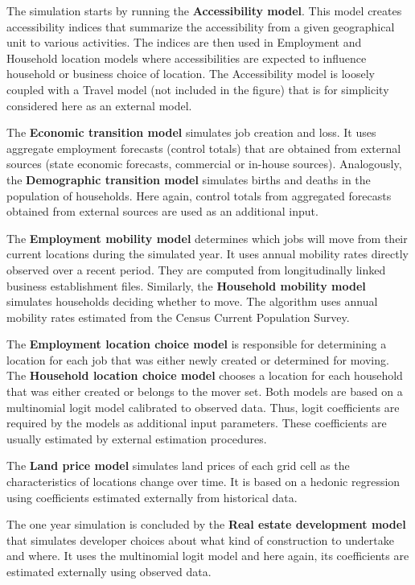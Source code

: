 \documentclass[11pt, fleqn]{article}
\begin{document}
The simulation starts by running the {\bf Accessibility model}. This model
creates accessibility indices that summarize the accessibility from a given
geographical unit to various activities. The indices are then used in
Employment and Household location models where accessibilities are expected to
influence household or business choice of location. The Accessibility model is
loosely coupled with a Travel model (not included in the figure) that is for
simplicity considered here as an external model.

The {\bf Economic transition model} simulates job creation and loss. It uses
aggregate employment forecasts (control totals) that are obtained from
external sources (state economic forecasts, commercial or in-house sources).
Analogously, the {\bf Demographic transition model} simulates births and
deaths in the population of households. Here again, control totals from
aggregated forecasts obtained from external sources are used as an additional
input.

The {\bf Employment mobility model} determines which jobs will move from their
current locations during the simulated year. It uses annual mobility rates
directly observed over a recent period. They are computed from longitudinally
linked business establishment files. Similarly, the {\bf Household
  mobility model} simulates households deciding whether to move. The algorithm 
uses annual mobility rates estimated from the Census Current Population
Survey. 

The {\bf Employment location choice model} is responsible for determining a
location for each job that was either newly created or determined for
moving. The  {\bf Household location choice model} chooses a location for each
household that was either created or belongs to the mover set. Both models are
based on a multinomial logit model calibrated to observed data. Thus,
logit coefficients are required by the models as additional input
parameters. These coefficients are usually estimated by external estimation
procedures.  

The {\bf Land price model} simulates land prices of each grid cell as the
characteristics of locations change over time. It is based on a hedonic
regression~\citep{waddell93} using coefficients estimated externally from
historical data. 

The one year simulation is concluded by the {\bf Real estate development
  model} that simulates developer choices about what kind of construction to
undertake and where. It uses the multinomial logit model and here again, its
coefficients are estimated externally using observed data.
\end{document}
